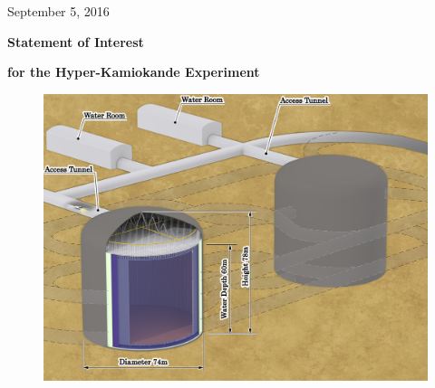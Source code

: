 \documentclass[11pt]{article}
\newcommand\introTitleColor{\color{Cerulean}}
\begin{document}
\setcounter{page}{1}

%
\begin{flushright}
September 5, 2016\\
\end{flushright}
\vspace{5ex}
\centerline{\introTitleColor\Huge \bf Statement of Interest}
\centerline{\introTitleColor\Huge \bf for the Hyper-Kamiokande Experiment}
%
\vspace{5ex}
\bigskip

\vspace{5ex}
%
%
%
\hspace{0.5cm}
\begin{figure}[htb]
\begin{center}
\includegraphics[scale=0.25]{figs/hyperk.png}
\end{center}
\end{figure}

\hspace{0.1cm}
\vspace{1ex}
\end{document}
